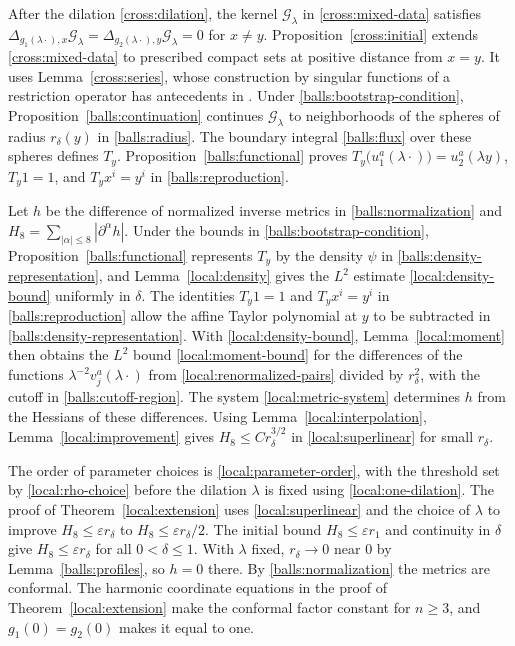 \documentclass[11pt,a4paper]{article}
\theoremstyle{definition}
\theoremstyle{remark}
\newcommand{\eps}{\varepsilon}
\numberwithin{equation}{section}
\begin{document}
After the dilation \eqref{cross:dilation}, the kernel
$\mathcal G_\lambda$ in \eqref{cross:mixed-data} satisfies
$\Delta_{g_1(\lambda\cdot),x}\mathcal G_\lambda=
\Delta_{g_2(\lambda\cdot),y}\mathcal G_\lambda=0$ for $x\ne y$.
Proposition~\ref{cross:initial} extends \eqref{cross:mixed-data} to
prescribed compact sets at positive distance from $x=y$. It uses
Lemma~\ref{cross:series}, whose construction by singular functions of
a restriction operator has antecedents in \cite{Zeriahi1982}.
Under \eqref{balls:bootstrap-condition},
Proposition~\ref{balls:continuation} continues $\mathcal G_\lambda$
to neighborhoods of the spheres of radius $r_\delta(y)$ in
\eqref{balls:radius}. The boundary integral \eqref{balls:flux} over
these spheres defines $T_y$. Proposition~\ref{balls:functional} proves
$T_y\bigl(u_1^a(\lambda\cdot)\bigr)=u_2^a(\lambda y)$,
$T_y1=1$, and $T_yx^i=y^i$ in \eqref{balls:reproduction}.

Let $h$ be the difference of normalized inverse metrics in
\eqref{balls:normalization} and
$H_8=\sum_{|\alpha|\le8}|\partial^\alpha h|$. Under the bounds in
\eqref{balls:bootstrap-condition}, Proposition~\ref{balls:functional}
represents $T_y$ by the density $\psi$ in
\eqref{balls:density-representation}, and Lemma~\ref{local:density}
gives the $L^2$ estimate \eqref{local:density-bound} uniformly in
$\delta$. The identities $T_y1=1$ and $T_yx^i=y^i$ in
\eqref{balls:reproduction} allow the affine Taylor polynomial at $y$
to be subtracted in \eqref{balls:density-representation}. With
\eqref{local:density-bound}, Lemma~\ref{local:moment} then obtains the
$L^2$ bound \eqref{local:moment-bound} for the differences of the
functions $\lambda^{-2}v_j^a(\lambda\cdot)$ from
\eqref{local:renormalized-pairs} divided by
$r_\delta^2$, with the cutoff in \eqref{balls:cutoff-region}.
The system \eqref{local:metric-system} determines $h$ from the Hessians
of these differences. Using Lemma~\ref{local:interpolation},
Lemma~\ref{local:improvement} gives $H_8\le Cr_\delta^{3/2}$ in
\eqref{local:superlinear} for small $r_\delta$.

The order of parameter choices is \eqref{local:parameter-order},
with the threshold set by \eqref{local:rho-choice} before the
dilation $\lambda$ is fixed using \eqref{local:one-dilation}.
The proof of Theorem~\ref{local:extension} uses
\eqref{local:superlinear} and the choice of $\lambda$ to improve
$H_8\le\eps r_\delta$ to $H_8\le\eps r_\delta/2$. The initial bound
$H_8\le\eps r_1$ and continuity in $\delta$ give
$H_8\le\eps r_\delta$ for all $0<\delta\le1$. With $\lambda$ fixed,
$r_\delta\to0$ near $0$ by Lemma~\ref{balls:profiles}, so $h=0$ there.
By \eqref{balls:normalization} the metrics are conformal. The harmonic
coordinate equations in the proof of Theorem~\ref{local:extension}
make the conformal factor constant for $n\ge3$, and
$g_1(0)=g_2(0)$ makes it equal to one.
\end{document}
